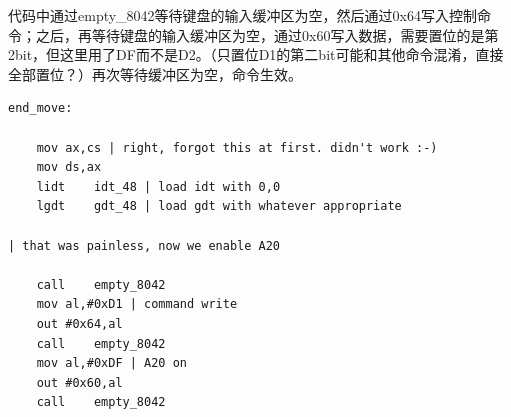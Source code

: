 \documentclass[12pt]{article}
\begin{document}
代码中通过empty\_8042等待键盘的输入缓冲区为空，然后通过0x64写入控制命令；之后，再等待键盘的输入缓冲区为空，通过0x60写入数据，需要置位的是第2bit，但这里用了DF而不是D2。（只置位D1的第二bit可能和其他命令混淆，直接全部置位？）再次等待缓冲区为空，命令生效。

\begin{lstlisting}[breaklines]
end_move:

	mov	ax,cs | right, forgot this at first. didn't work :-)
	mov	ds,ax
	lidt	idt_48 | load idt with 0,0
	lgdt	gdt_48 | load gdt with whatever appropriate
	
| that was painless, now we enable A20

	call	empty_8042
	mov	al,#0xD1 | command write
	out	#0x64,al
	call	empty_8042
	mov	al,#0xDF | A20 on
	out	#0x60,al
	call	empty_8042
\end{lstlisting}
\end{document}

